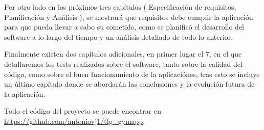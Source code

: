 Por otro lado en los próximos tres capítulos ( Especificación de requisitos, Planificación y Análisis ), se mostrará que requisitos debe cumplir la aplicación para que pueda llevar a cabo su cometido, como se planificó el desarrollo del software a lo largo del tiempo y un análisis detallado de todo lo anterior.

Finalmente existen dos capítulos adicionales, en primer lugar el 7, en el que detallaremos los tests realizados sobre el software, tanto sobre la calidad del código, como sobre el buen funcionamiento de la aplicaciónes, tras esto se incluye un último capítulo donde se abordarán las conclusiones y la evolución futura de la aplicación.

Todo el código del proyecto se puede encontrar en \url{https://github.com/antoniovj1/tfg_gymapp}.